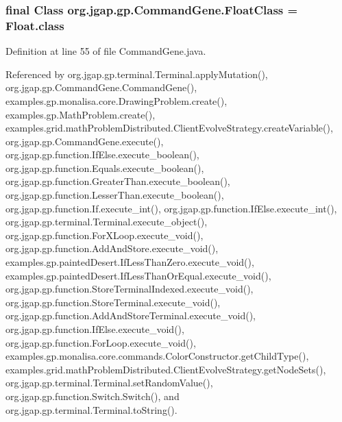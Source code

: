 \hypertarget{classorg_1_1jgap_1_1gp_1_1_command_gene_a45c853c890dbbba4a629bca1688ab16e}{
\subsubsection[{Float\-Class}]{\setlength{\rightskip}{0pt plus 5cm}final Class org.\-jgap.\-gp.\-Command\-Gene.\-Float\-Class = Float.\-class\hspace{0.3cm}{\ttfamily [static]}}}\label{classorg_1_1jgap_1_1gp_1_1_command_gene_a45c853c890dbbba4a629bca1688ab16e}


Definition at line 55 of file Command\-Gene.\-java.



Referenced by org.\-jgap.\-gp.\-terminal.\-Terminal.\-apply\-Mutation(), org.\-jgap.\-gp.\-Command\-Gene.\-Command\-Gene(), examples.\-gp.\-monalisa.\-core.\-Drawing\-Problem.\-create(), examples.\-gp.\-Math\-Problem.\-create(), examples.\-grid.\-math\-Problem\-Distributed.\-Client\-Evolve\-Strategy.\-create\-Variable(), org.\-jgap.\-gp.\-Command\-Gene.\-execute(), org.\-jgap.\-gp.\-function.\-If\-Else.\-execute\-\_\-boolean(), org.\-jgap.\-gp.\-function.\-Equals.\-execute\-\_\-boolean(), org.\-jgap.\-gp.\-function.\-Greater\-Than.\-execute\-\_\-boolean(), org.\-jgap.\-gp.\-function.\-Lesser\-Than.\-execute\-\_\-boolean(), org.\-jgap.\-gp.\-function.\-If.\-execute\-\_\-int(), org.\-jgap.\-gp.\-function.\-If\-Else.\-execute\-\_\-int(), org.\-jgap.\-gp.\-terminal.\-Terminal.\-execute\-\_\-object(), org.\-jgap.\-gp.\-function.\-For\-X\-Loop.\-execute\-\_\-void(), org.\-jgap.\-gp.\-function.\-Add\-And\-Store.\-execute\-\_\-void(), examples.\-gp.\-painted\-Desert.\-If\-Less\-Than\-Zero.\-execute\-\_\-void(), examples.\-gp.\-painted\-Desert.\-If\-Less\-Than\-Or\-Equal.\-execute\-\_\-void(), org.\-jgap.\-gp.\-function.\-Store\-Terminal\-Indexed.\-execute\-\_\-void(), org.\-jgap.\-gp.\-function.\-Store\-Terminal.\-execute\-\_\-void(), org.\-jgap.\-gp.\-function.\-Add\-And\-Store\-Terminal.\-execute\-\_\-void(), org.\-jgap.\-gp.\-function.\-If\-Else.\-execute\-\_\-void(), org.\-jgap.\-gp.\-function.\-For\-Loop.\-execute\-\_\-void(), examples.\-gp.\-monalisa.\-core.\-commands.\-Color\-Constructor.\-get\-Child\-Type(), examples.\-grid.\-math\-Problem\-Distributed.\-Client\-Evolve\-Strategy.\-get\-Node\-Sets(), org.\-jgap.\-gp.\-terminal.\-Terminal.\-set\-Random\-Value(), org.\-jgap.\-gp.\-function.\-Switch.\-Switch(), and org.\-jgap.\-gp.\-terminal.\-Terminal.\-to\-String().

